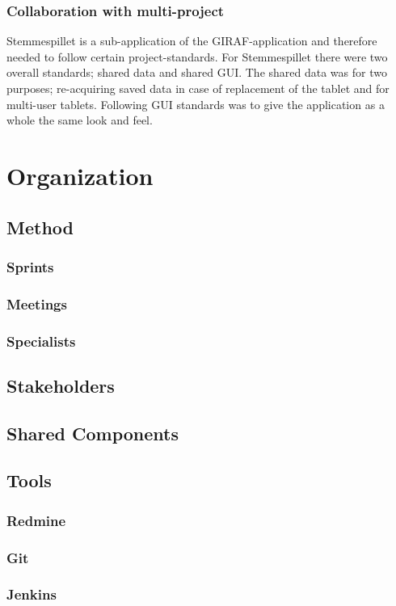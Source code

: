 \subsubsection{Collaboration with multi-project}
Stemmespillet is a sub-application of the GIRAF-application and therefore needed to follow certain project-standards.
For Stemmespillet there were two overall standards; shared data and shared GUI.
The shared data was for two purposes; re-acquiring saved data in case of replacement of the tablet and for multi-user tablets.
Following GUI standards was to give the application as a whole the same look and feel.

\section{Organization}

\subsection{Method}

\subsubsection{Sprints}

\subsubsection{Meetings}

\subsubsection{Specialists}

\subsection{Stakeholders}

\subsection{Shared Components}

\subsection{Tools}

\subsubsection{Redmine}

\subsubsection{Git}

\subsubsection{Jenkins}